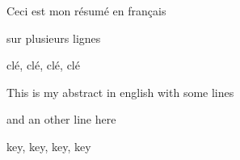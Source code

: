 

Ceci est mon résumé en français

sur plusieurs lignes

clé, clé, clé, clé


This is my abstract in english
with some lines

and an other line here

key, key, key, key


